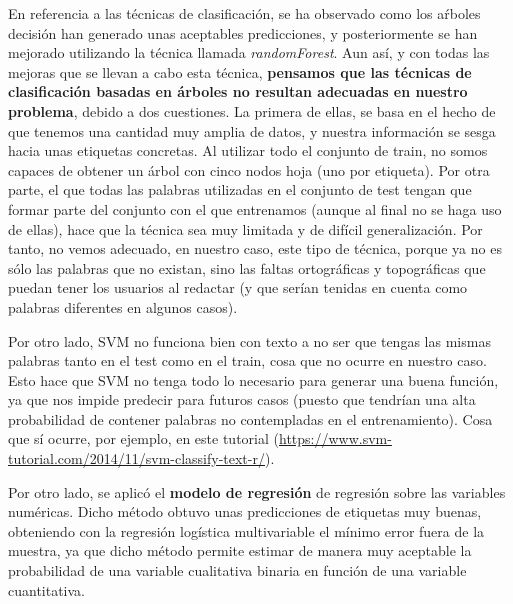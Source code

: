 \documentclass[spanish,]{article}
\begin{document}
En referencia a las técnicas de clasificación, se ha observado como los
aŕboles decisión han generado unas aceptables predicciones, y
posteriormente se han mejorado utilizando la técnica llamada
\emph{randomForest}. Aun así, y con todas las mejoras que se llevan a
cabo esta técnica, \textbf{pensamos que las técnicas de clasificación
basadas en árboles no resultan adecuadas en nuestro problema}, debido a
dos cuestiones. La primera de ellas, se basa en el hecho de que tenemos
una cantidad muy amplia de datos, y nuestra información se sesga hacia
unas etiquetas concretas. Al utilizar todo el conjunto de train, no
somos capaces de obtener un árbol con cinco nodos hoja (uno por
etiqueta). Por otra parte, el que todas las palabras utilizadas en el
conjunto de test tengan que formar parte del conjunto con el que
entrenamos (aunque al final no se haga uso de ellas), hace que la
técnica sea muy limitada y de difícil generalización. Por tanto, no
vemos adecuado, en nuestro caso, este tipo de técnica, porque ya no es
sólo las palabras que no existan, sino las faltas ortográficas y
topográficas que puedan tener los usuarios al redactar (y que serían
tenidas en cuenta como palabras diferentes en algunos casos).

Por otro lado, SVM no funciona bien con texto a no ser que tengas las
mismas palabras tanto en el test como en el train, cosa que no ocurre en
nuestro caso. Esto hace que SVM no tenga todo lo necesario para generar
una buena función, ya que nos impide predecir para futuros casos (puesto
que tendrían una alta probabilidad de contener palabras no contempladas
en el entrenamiento). Cosa que sí ocurre, por ejemplo, en este tutorial
(\url{https://www.svm-tutorial.com/2014/11/svm-classify-text-r/}).

Por otro lado, se aplicó el \textbf{modelo de regresión} de regresión
sobre las variables numéricas. Dicho método obtuvo unas predicciones de
etiquetas muy buenas, obteniendo con la regresión logística
multivariable el mínimo error fuera de la muestra, ya que dicho método
permite estimar de manera muy aceptable la probabilidad de una variable
cualitativa binaria en función de una variable cuantitativa.
\end{document}
